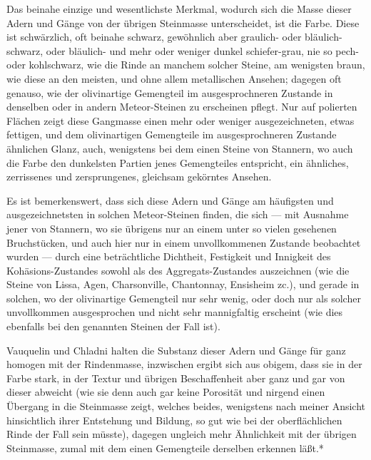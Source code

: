 \documentclass[a4paper, 11pt, oneside, german]{article}
\begin{document}
Das beinahe einzige und wesentlichste Merkmal, wodurch sich die Masse dieser Adern und Gänge von der übrigen Steinmasse unterscheidet, ist die Farbe. Diese ist schwärzlich, oft beinahe schwarz, gewöhnlich aber graulich- oder bläulich-schwarz, oder bläulich- und mehr oder weniger dunkel schiefer-grau, nie so pech- oder kohlschwarz, wie die Rinde an manchem solcher Steine, am wenigsten braun, wie diese an den meisten, und ohne allem metallischen Ansehen; dagegen oft genauso, wie der olivinartige Gemengteil im ausgesprochneren Zustande in denselben oder in andern Meteor-Steinen zu erscheinen pflegt. Nur auf polierten Flächen zeigt diese Gangmasse einen mehr oder weniger ausgezeichneten, etwas fettigen, und dem olivinartigen Gemengteile im ausgesprochneren Zustande ähnlichen Glanz, auch, wenigstens bei dem einen Steine von Stannern, wo auch die Farbe den dunkelsten Partien jenes Gemengteiles entspricht, ein ähnliches, zerrissenes und zersprungenes, gleichsam gekörntes Ansehen.

Es ist bemerkenswert, dass sich diese Adern und Gänge am häufigsten und ausgezeichnetsten in solchen Meteor-Steinen finden, die sich --- mit Ausnahme jener von Stannern, wo sie übrigens nur an einem unter so vielen gesehenen Bruchstücken, und auch hier nur in einem unvollkommenen Zustande beobachtet wurden --- durch eine beträchtliche Dichtheit, Festigkeit und Innigkeit des Kohäsions-Zustandes sowohl als des Aggregats-Zustandes auszeichnen (wie die Steine von Lissa, Agen, Charsonville, Chantonnay, Ensisheim zc.), und gerade in solchen, wo der olivinartige Gemengteil nur sehr wenig, oder doch nur als solcher unvollkommen ausgesprochen und nicht sehr mannigfaltig erscheint (wie dies ebenfalls bei den genannten Steinen der Fall ist).

Vauquelin und Chladni halten die Substanz dieser Adern und Gänge für ganz homogen mit der Rindenmasse, inzwischen ergibt sich aus obigem, dass sie in der Farbe stark, in der Textur und übrigen Beschaffenheit aber ganz und gar von dieser abweicht (wie sie denn auch gar keine Porosität und nirgend einen Übergang in die Steinmasse zeigt, welches beides, wenigstens nach meiner Ansicht hinsichtlich ihrer Entstehung und Bildung, so gut wie bei der oberflächlichen Rinde der Fall sein müsste), dagegen ungleich mehr Ähnlichkeit mit der übrigen Steinmasse, zumal mit dem einen Gemengteile derselben erkennen läßt.*
\end{document}
